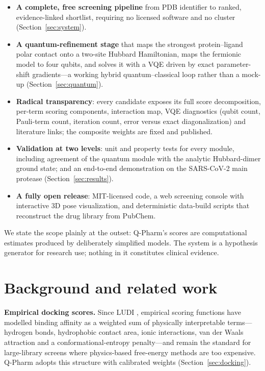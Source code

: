 \documentclass[10pt,a4paper,twocolumn]{article}
\begin{document}
\begin{itemize}[leftmargin=1.4em,itemsep=1pt,topsep=3pt]
\item \textbf{A complete, free screening pipeline} from PDB identifier to ranked,
      evidence-linked shortlist, requiring no licensed software and no cluster
      (Section~\ref{sec:system}).
\item \textbf{A quantum-refinement stage} that maps the strongest protein--ligand polar
      contact onto a two-site Hubbard Hamiltonian, maps the fermionic model to four
      qubits, and solves it with a VQE driven by exact parameter-shift gradients---a
      working hybrid quantum--classical loop rather than a mock-up
      (Section~\ref{sec:quantum}).
\item \textbf{Radical transparency}: every candidate exposes its full score
      decomposition, per-term scoring components, interaction map, VQE diagnostics
      (qubit count, Pauli-term count, iteration count, error versus exact
      diagonalization) and literature links; the composite weights are fixed and
      published.
\item \textbf{Validation at two levels}: unit and property tests for every module,
      including agreement of the quantum module with the analytic Hubbard-dimer ground
      state; and an end-to-end demonstration on the SARS-CoV-2 main protease
      (Section~\ref{sec:results}).
\item \textbf{A fully open release}: MIT-licensed code, a web screening console with
      interactive 3D pose visualization, and deterministic data-build scripts that
      reconstruct the drug library from PubChem.
\end{itemize}

We state the scope plainly at the outset: Q-Pharm's scores are computational estimates
produced by deliberately simplified models. The system is a hypothesis generator for
research use; nothing in it constitutes clinical evidence.

\section{Background and related work}

\textbf{Empirical docking scores.} Since LUDI \cite{bohm1992}, empirical scoring
functions have modelled binding affinity as a weighted sum of physically interpretable
terms---hydrogen bonds, hydrophobic contact area, ionic interactions, van der Waals
attraction and a conformational-entropy penalty---and remain the standard for
large-library screens where physics-based free-energy methods are too expensive. Q-Pharm
adopts this structure with calibrated weights (Section~\ref{sec:docking}).
\end{document}
